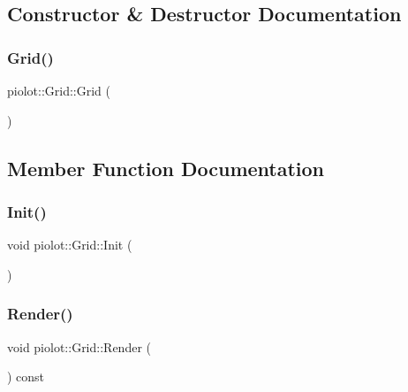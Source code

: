 \subsection{Constructor \& Destructor Documentation}
\mbox{\label{classpiolot_1_1_grid_ab43feb8d7b505cf880c6d328aabe1adf}} 
\subsubsection{\texorpdfstring{Grid()}{Grid()}}
{\footnotesize\ttfamily piolot\+::\+Grid\+::\+Grid (\begin{DoxyParamCaption}{ }\end{DoxyParamCaption})\hspace{0.3cm}{\ttfamily [default]}}



\subsection{Member Function Documentation}
\mbox{\label{classpiolot_1_1_grid_acde85bc00911a143d9407a814e1d6d88}} 
\subsubsection{\texorpdfstring{Init()}{Init()}}
{\footnotesize\ttfamily void piolot\+::\+Grid\+::\+Init (\begin{DoxyParamCaption}{ }\end{DoxyParamCaption})}

\mbox{\label{classpiolot_1_1_grid_a36c9dfed35987b298ca3bf4ff3cb06a8}} 
\subsubsection{\texorpdfstring{Render()}{Render()}}
{\footnotesize\ttfamily void piolot\+::\+Grid\+::\+Render (\begin{DoxyParamCaption}{ }\end{DoxyParamCaption}) const}


